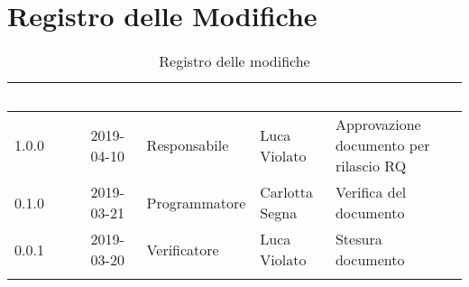\newpage

\section*{Registro delle Modifiche}

\begin{center}
\begin{longtable}[c]{|m{}|m{}|m{}|m{}|p{}|}
\hline
\rowcolor{bluelogo}\textbf{\textcolor{white}{Versione}} & \textbf{\textcolor{white}{Data}} & \textbf{\textcolor{white}{Ruolo}} & \textbf{\textcolor{white}{Autore}} & \textbf{\textcolor{white}{Descrizione}}\\
\hline \hline
\endfirsthead
1.0.0 & 2019-04-10 & Responsabile & Luca Violato & Approvazione documento per rilascio RQ \\
\hline
\rowcolor{grigio} 0.1.0 & 2019-03-21 & Programmatore & Carlotta Segna & Verifica del documento \\
\hline
0.0.1 & 2019-03-20 & Verificatore & Luca Violato & Stesura documento \\
\hline
\caption{Registro delle modifiche}
\end{longtable}
\end{center}
